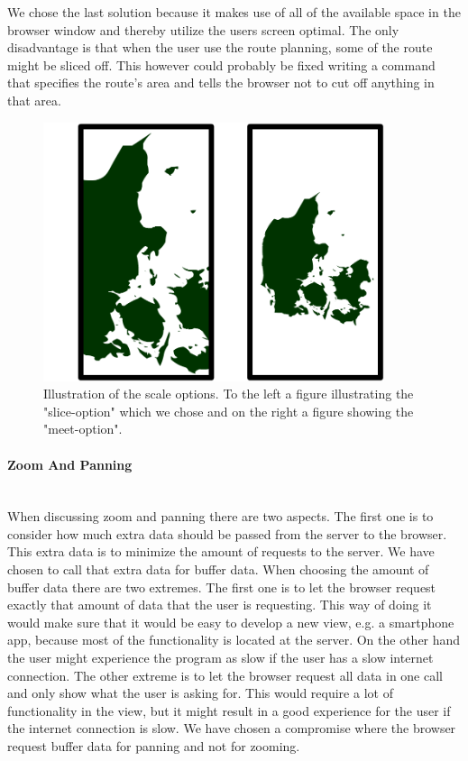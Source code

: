 \documentclass[a4paper,10pt,titlepage]{article}
\begin{document}
We chose the last solution because it makes use of all of the available space in the browser window and thereby utilize the users screen optimal. The only disadvantage is that when the user use the route planning, some of the route might be sliced off. This however could probably be fixed writing a command that specifies the route's area and tells the browser not to cut off anything in that area.
\begin{figure}[H]
\includegraphics[width=100mm]{mapSliceMeet.png}
\caption{Illustration of the scale options. To the left a figure illustrating the "slice-option" which we chose and on the right a figure showing the "meet-option".}
\label{fig:mapSliceMeet}
\end{figure}


\paragraph{Zoom And Panning}\mbox{}\\
When discussing zoom and panning there are two aspects. The first one is to consider how much extra data should be passed from the server to the browser. This extra data is to minimize the amount of requests to the server. We have chosen to call that extra data for buffer data. When choosing the amount of buffer data there are two extremes. The first one is to let the browser request exactly that amount of data that the user is requesting. This way of doing it would make sure that it would be easy to develop a new view, e.g. a smartphone app, because most of the functionality is located at the server. On the other hand the user might experience the program as slow if the user has a slow internet connection. The other extreme is to let the browser request all data in one call and only show what the user is asking for. This would require a lot of functionality in the view, but it might result in a good experience for the user if the internet connection is slow. We have chosen a compromise where the browser request buffer data for panning and not for zooming.
\end{document}
